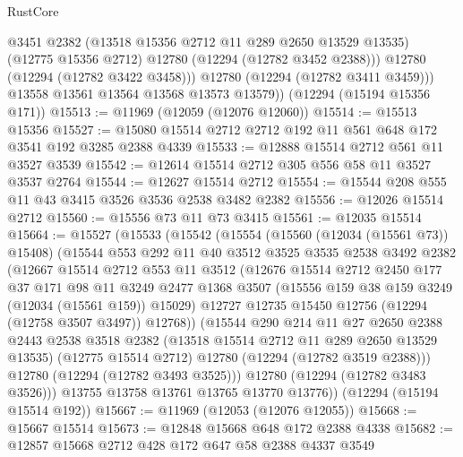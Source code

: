 \begin{lexlean}{RustCore}
\begin{coremodule}
              @3451
              @2382
              (@13518 @15356 @2712 @11 @289 @2650 @13529 @13535)
              (@12775 @15356 @2712)
              @12780
              (@12294 (@12782 @3452 @2388)))
            @12780
            (@12294 (@12782 @3422 @3458)))
          @12780
          (@12294 (@12782 @3411 @3459)))
        @13558
        @13561
        @13564
        @13568
        @13573
        @13579))
    (@12294 (@15194 @15356 @171))
@15513 := @11969 (@12059 (@12076 @12060))
@15514 := @15513 @15356
@15527 := @15080 @15514 @2712 @2712 @192 @11 @561 @648 @172 @3541 @192 @3285 @2388 @4339
@15533 := @12888 @15514 @2712 @561 @11 @3527 @3539
@15542 := @12614 @15514 @2712 @305 @556 @58 @11 @3527 @3537 @2764
@15544 := @12627 @15514 @2712
@15554 := @15544 @208 @555 @11 @43 @3415 @3526 @3536 @2538 @3482 @2382
@15556 := @12026 @15514 @2712
@15560 := @15556 @73 @11 @73 @3415
@15561 := @12035 @15514
@15664 := @15527
    (@15533
      (@15542
        (@15554
          (@15560 (@12034 (@15561 @73)) @15408)
          (@15544
            @553
            @292
            @11
            @40
            @3512
            @3525
            @3535
            @2538
            @3492
            @2382
            (@12667
              @15514
              @2712
              @553
              @11
              @3512
              (@12676
                @15514
                @2712
                @2450
                @177
                @37
                @171
                @98
                @11
                @3249
                @2477
                @1368
                @3507
                (@15556 @159 @38 @159 @3249 (@12034 (@15561 @159)) @15029)
                @12727
                @12735
                @15450
                @12756
                (@12294 (@12758 @3507 @3497))
                @12768))
            (@15544
              @290
              @214
              @11
              @27
              @2650
              @2388
              @2443
              @2538
              @3518
              @2382
              (@13518 @15514 @2712 @11 @289 @2650 @13529 @13535)
              (@12775 @15514 @2712)
              @12780
              (@12294 (@12782 @3519 @2388)))
            @12780
            (@12294 (@12782 @3493 @3525)))
          @12780
          (@12294 (@12782 @3483 @3526)))
        @13755
        @13758
        @13761
        @13765
        @13770
        @13776))
    (@12294 (@15194 @15514 @192))
@15667 := @11969 (@12053 (@12076 @12055))
@15668 := @15667 @15514
@15673 := @12848 @15668 @648 @172 @2388 @4338
@15682 := @12857 @15668 @2712 @428 @172 @647 @58 @2388 @4337 @3549

\end{coremodule}
\end{lexlean}
